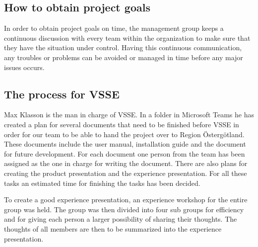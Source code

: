 \subsection{How to obtain project goals}
In order to obtain project goals on time, the management group keeps a continuous discussion with every team within the organization to make sure that they have the situation under control. Having this continuous communication, any troubles or problems can be avoided or managed in time before any major issues occurs. 

\subsection{The process for VSSE}
Max Klasson is the man in charge of VSSE. In a folder in Microsoft Teams he has created a plan for several documents that need to be finished before VSSE in order for our team to be able to hand the project over to Region Östergötland. These documents include the user manual, installation guide and the document for future development. For each document one person from the team has been assigned as the one in charge for writing the document. There are also plans for creating the product presentation and the experience presentation. For all these tasks an estimated time for finishing the tasks has been
decided. 

To create a good experience presentation, an experience workshop for the entire group was held. The group was then divided into four sub groups for efficiency and for giving each person a larger possibility of sharing their thoughts. The thoughts of all members are then to be summarized into the experience presentation. 